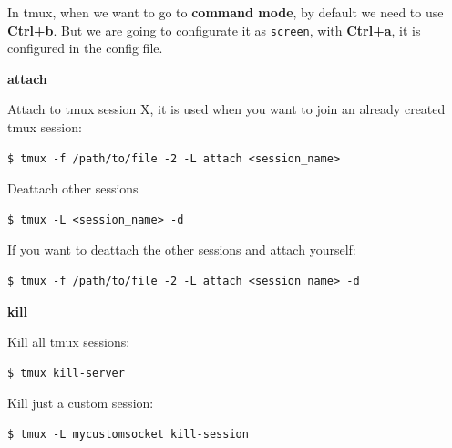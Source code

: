 \documentclass{article}
\newenvironment{codetemplate}[1][]{%
  \mybasecolorbox[#1]
  \itshape
}{%
  \endmybasecolorbox
}
\begin{document}
In tmux, when we want to go to \textbf{command mode}, by default we need to use \textbf{Ctrl+b}. But we are going to configurate it as \verb|screen|, with \textbf{Ctrl+a}, it is configured in the config file.


\textbf{attach}

Attach to tmux session X, it is used when you want to join an already created tmux session:

\begin{codetemplate}
\begin{verbatim}
$ tmux -f /path/to/file -2 -L attach <session_name>
\end{verbatim}
\end{codetemplate}

Deattach other sessions
\begin{codetemplate}
\begin{verbatim}
$ tmux -L <session_name> -d
\end{verbatim}
\end{codetemplate}

If you want to deattach the other sessions and attach yourself:
\begin{codetemplate}
\begin{verbatim}
$ tmux -f /path/to/file -2 -L attach <session_name> -d
\end{verbatim}
\end{codetemplate}

\textbf{kill}

Kill all tmux sessions:
\begin{codetemplate}
\begin{verbatim}
$ tmux kill-server
\end{verbatim}
\end{codetemplate}

Kill just a custom session:
\begin{codetemplate}
\begin{verbatim}
$ tmux -L mycustomsocket kill-session
\end{verbatim}
\end{codetemplate}
    
\end{document}
